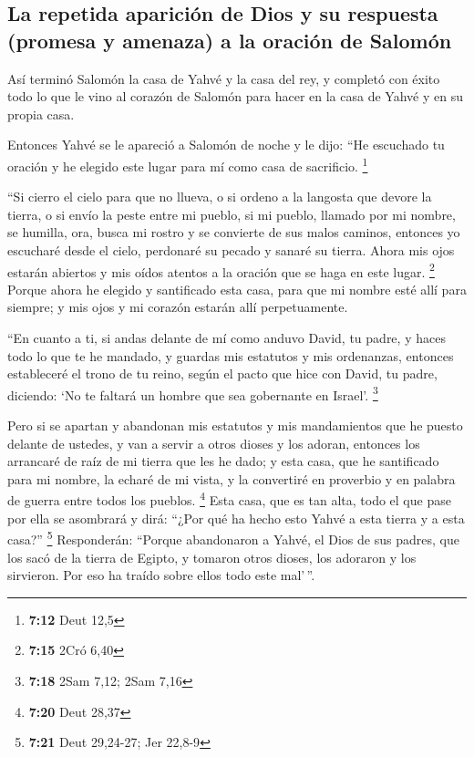 \begin{paracol}{2}
{\subsection{La repetida aparición de Dios y su respuesta (promesa y
amenaza) a la oración de
Salomón}\label{la-repetida-apariciuxf3n-de-dios-y-su-respuesta-promesa-y-amenaza-a-la-oraciuxf3n-de-salomuxf3n}}

 Así terminó Salomón la casa de Yahvé y la casa del rey,
y completó con éxito todo lo que le vino al corazón de Salomón para
hacer en la casa de Yahvé y en su propia casa.

 Entonces Yahvé se le apareció a Salomón de noche y le
dijo: ``He escuchado tu oración y he elegido este lugar para mí como
casa de sacrificio. \footnote{\textbf{7:12} Deut 12,5}

 ``Si cierro el cielo para que no llueva, o si ordeno a
la langosta que devore la tierra, o si envío la peste entre mi pueblo,
 si mi pueblo, llamado por mi nombre, se humilla, ora,
busca mi rostro y se convierte de sus malos caminos, entonces yo
escucharé desde el cielo, perdonaré su pecado y sanaré su tierra.
 Ahora mis ojos estarán abiertos y mis oídos atentos a la
oración que se haga en este lugar. \footnote{\textbf{7:15} 2Cró 6,40}
 Porque ahora he elegido y santificado esta casa, para
que mi nombre esté allí para siempre; y mis ojos y mi corazón estarán
allí perpetuamente.

 ``En cuanto a ti, si andas delante de mí como anduvo
David, tu padre, y haces todo lo que te he mandado, y guardas mis
estatutos y mis ordenanzas,  entonces estableceré el
trono de tu reino, según el pacto que hice con David, tu padre,
diciendo: `No te faltará un hombre que sea gobernante en Israel'.
\footnote{\textbf{7:18} 2Sam 7,12; 2Sam 7,16}

 Pero si se apartan y abandonan mis estatutos y mis
mandamientos que he puesto delante de ustedes, y van a servir a otros
dioses y los adoran,  entonces los arrancaré de raíz de
mi tierra que les he dado; y esta casa, que he santificado para mi
nombre, la echaré de mi vista, y la convertiré en proverbio y en palabra
de guerra entre todos los pueblos. \footnote{\textbf{7:20} Deut 28,37}
 Esta casa, que es tan alta, todo el que pase por ella se
asombrará y dirá: ``¿Por qué ha hecho esto Yahvé a esta tierra y a esta
casa?'' \footnote{\textbf{7:21} Deut 29,24-27; Jer 22,8-9}
 Responderán: ``Porque abandonaron a Yahvé, el Dios de
sus padres, que los sacó de la tierra de Egipto, y tomaron otros dioses,
los adoraron y los sirvieron. Por eso ha traído sobre ellos todo este
mal'\,''.


\end{paracol}
